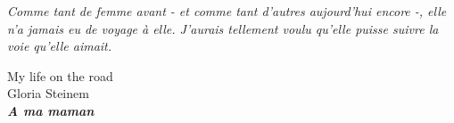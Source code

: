 \thispagestyle{empty}



\vspace*{\fill} \epigraph{\itshape Comme tant de femme avant - et comme tant d'autres aujourd'hui encore -, elle n'a jamais eu de voyage à elle. J'aurais tellement voulu qu'elle puisse suivre la voie qu'elle aimait.}{My life on the road \\ Gloria Steinem \\ \itshape \textbf{A ma maman}}
\vfill\clearpage
